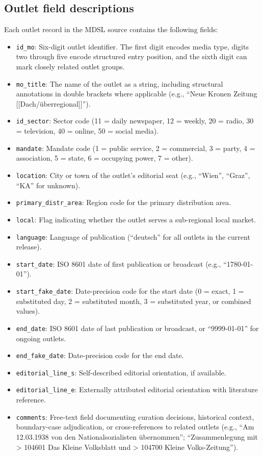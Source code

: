 \documentclass[11pt]{article}
\begin{document}
\subsection{Outlet field descriptions}

Each outlet record in the MDSL source contains the following fields:

\begin{itemize}
\item \texttt{id\_mo}: Six-digit outlet identifier. The first digit encodes media type, digits two through five encode structured entry position, and the sixth digit can mark closely related outlet groups.
\item \texttt{mo\_title}: The name of the outlet as a string, including structural annotations in double brackets where applicable (e.g., ``Neue Kronen Zeitung [[Dach/\"uberregional]]'').
\item \texttt{id\_sector}: Sector code (11 = daily newspaper, 12 = weekly, 20 = radio, 30 = television, 40 = online, 50 = social media).
\item \texttt{mandate}: Mandate code (1 = public service, 2 = commercial, 3 = party, 4 = association, 5 = state, 6 = occupying power, 7 = other).
\item \texttt{location}: City or town of the outlet's editorial seat (e.g., ``Wien'', ``Graz'', ``KA'' for unknown).
\item \texttt{primary\_distr\_area}: Region code for the primary distribution area.
\item \texttt{local}: Flag indicating whether the outlet serves a sub-regional local market.
\item \texttt{language}: Language of publication (``deutsch'' for all outlets in the current release).
\item \texttt{start\_date}: ISO 8601 date of first publication or broadcast (e.g., ``1780-01-01'').
\item \texttt{start\_fake\_date}: Date-precision code for the start date (0 = exact, 1 = substituted day, 2 = substituted month, 3 = substituted year, or combined values).
\item \texttt{end\_date}: ISO 8601 date of last publication or broadcast, or ``9999-01-01'' for ongoing outlets.
\item \texttt{end\_fake\_date}: Date-precision code for the end date.
\item \texttt{editorial\_line\_s}: Self-described editorial orientation, if available.
\item \texttt{editorial\_line\_e}: Externally attributed editorial orientation with literature reference.
\item \texttt{comments}: Free-text field documenting curation decisions, historical context, boundary-case adjudication, or cross-references to related outlets (e.g., ``Am 12.03.1938 von den Nationalsozialisten \"ubernommen''; ``Zusammenlegung mit > 104601 Das Kleine Volksblatt und > 104700 Kleine Volks-Zeitung'').
\end{itemize}
\end{document}
